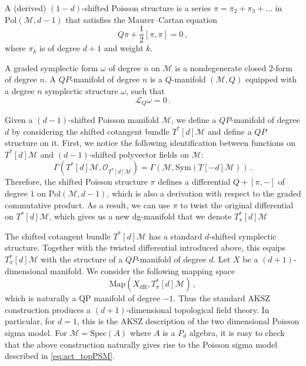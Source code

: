 \documentclass[11pt]{article}
\numberwithin{equation}{section}
\begin{document}
A (derived) $(1-d)$-shifted Poisson structure is a series $\pi = \pi_2 + \pi_3 + \dots$ in $\mathrm{Pol}(\mathcal{M},d-1)$ that satisfies the Maurer–Cartan equation
\begin{equation}
	Q\pi + \frac{1}{2}[\pi,\pi] = 0\,,
\end{equation}
where $\pi_k$ is of degree $d+1$ and weight $k$.  

A graded symplectic form $\omega$ of degree $n$ on $\mathcal{M}$ is a nondegenerate closed 2-form of degree $n$. A $QP$-manifold of degree $n$ is a $Q$-manifold $(\mathcal{M}, Q)$ equipped with a degree $n$ symplectic structure $\omega$, such that 
\begin{equation}
	\mathcal{L}_Q\omega = 0\,.
\end{equation}

Given a $(d-1)$-shifted Poisson manifold $\mathcal{M}$, we define a $QP$-manifold of degree $d$ by considering the shifted cotangent bundle $T^*[d]\mathcal{M}$ and define a $QP$ structure on it. First, we notice the following identification between functions on $T^*[d]\mathcal{M}$ and $(d-1)$-shifted polyvector fields on $\mathcal{M}$: 
\begin{equation}
	\Gamma(T^*[d]\mathcal{M},\mathcal{O}_{T^*[d]\mathcal{M}}) = \Gamma(\mathcal{M},\mathrm{Sym}(T[-d]\mathcal{M}))\,.
\end{equation}
Therefore, the shifted Poisson structure $\pi$ defines a differential $Q + [\pi,-]$ of degree $1$ on $\mathrm{Pol}(\mathcal{M},d-1)$, which is also a derivation with respect to the graded commutative product. As a result, we can use $\pi$ to twist the original  differential on $T^*[d]\mathcal{M}$, which gives us a new dg-manifold that we denote $T_{\pi}^*[d]\mathcal{M}$

The shifted cotangent bundle $T^*[d]\mathcal{M}$ has a standard $d$-shifted symplectic structure. Together with the twisted differential introduced above, this equips $T_{\pi}^*[d]\mathcal{M}$ with the structure of a $QP$-manifold of degree $d$. Let $X$ be a $(d+1)$-dimensional manifold. We consider the following mapping space
\begin{equation}
	\mathrm{Map}(X_{\mathrm{dR}},T_{\pi}^*[d]\mathcal{M})\,,
\end{equation}
which is naturally a QP manifold of degree $-1$. Thus the standard AKSZ construction \cite{Alexandrov:1995kv,Ikeda:2012pv} produces a $(d+1)$-dimensional topological field theory. In particular, for $d = 1$, this is the AKSZ description of the two dimensional Poisson sigma model. For $\mathcal{M} = \mathrm{Spec}(A)$ where $A$ is a $P_d$ algebra, it is easy to check that the above construction naturally gives rise to the Poisson sigma model described in \eqref{eq:act_topPSM}.
\end{document}
